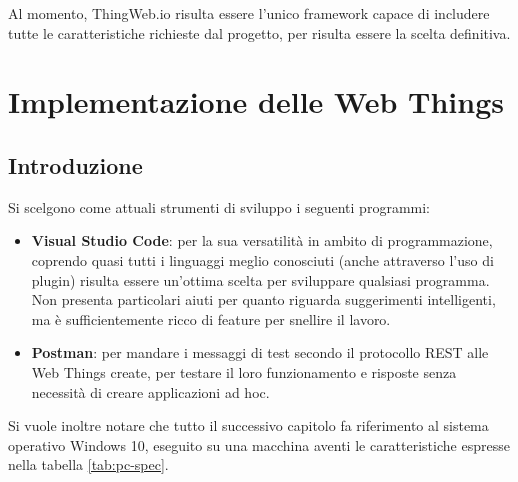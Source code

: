 \documentclass[12pt,a4paper,openright,oneside]{report}
\begin{document}
Al momento, ThingWeb.io risulta essere l'unico framework capace di includere tutte le caratteristiche richieste dal progetto, per risulta essere la scelta definitiva.


\clearpage{\pagestyle{empty}\cleardoublepage}
\chapter{Implementazione delle Web Things}           %
\lhead[\fancyplain{}{\bfseries\thepage}]{\fancyplain{}{\bfseries\rightmark}}  

\section{Introduzione}

Si scelgono come attuali strumenti di sviluppo i seguenti programmi:

\begin{itemize}
	\item \textbf{Visual Studio Code}: per la sua versatilità in ambito di programmazione, coprendo quasi tutti i linguaggi meglio conosciuti (anche attraverso l'uso di plugin) risulta essere un'ottima scelta per sviluppare qualsiasi programma. Non presenta particolari aiuti per quanto riguarda suggerimenti intelligenti, ma è sufficientemente ricco di feature per snellire il lavoro.
	
	\item \textbf{Postman}: per mandare i messaggi di test secondo il protocollo REST alle Web Things create, per testare il loro funzionamento e risposte senza necessità di creare applicazioni ad hoc.
\end{itemize}

Si vuole inoltre notare che tutto il successivo capitolo fa riferimento al sistema operativo Windows 10, eseguito su una macchina aventi le caratteristiche espresse nella tabella \ref{tab:pc-spec}.\\
\end{document}
